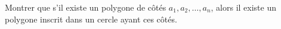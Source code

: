 Montrer que s'il existe un polygone de côtés $a_1, a_2, \ldots, a_n$, alors il existe un polygone inscrit dans un cercle ayant ces côtés.
